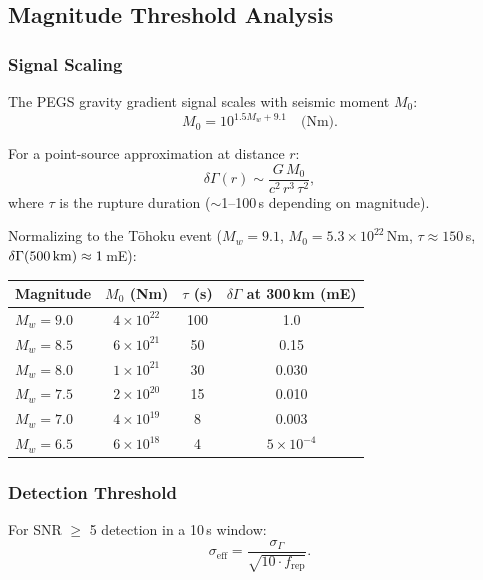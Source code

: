 \documentclass[11pt]{article}
\theoremstyle{definition}
\theoremstyle{remark}
\newcommand{\ee}[1]{\times10^{#1}}
\begin{document}
\subsection{Magnitude Threshold Analysis}

\subsubsection{Signal Scaling}

The PEGS gravity gradient signal scales with seismic moment $M_0$:
\begin{equation}
  M_0 = 10^{1.5 M_w + 9.1} \quad \text{(Nm)}.
\end{equation}

For a point-source approximation at distance $r$:
\begin{equation}
  \delta\Gamma(r) \sim \frac{G \, M_0}{c^2 \, r^3 \, \tau^2},
\end{equation}
where $\tau$ is the rupture duration ($\sim$1--100\,s depending on magnitude).

Normalizing to the T\=ohoku event ($M_w = 9.1$, $M_0 = 5.3\ee{22}$\,Nm,
$\tau \approx 150$\,s, $\delta\Gamma(\text{500\,km}) \approx 1$\,mE):

\begin{center}
\begin{tabular}{lccc}
\toprule
\textbf{Magnitude} & \textbf{$M_0$ (Nm)} & \textbf{$\tau$ (s)} & \textbf{$\delta\Gamma$ at 300\,km (mE)} \\
\midrule
$M_w = 9.0$ & $4\ee{22}$ & 100 & 1.0 \\
$M_w = 8.5$ & $6\ee{21}$ & 50 & 0.15 \\
$M_w = 8.0$ & $1\ee{21}$ & 30 & 0.030 \\
$M_w = 7.5$ & $2\ee{20}$ & 15 & 0.010 \\
$M_w = 7.0$ & $4\ee{19}$ & 8 & 0.003 \\
$M_w = 6.5$ & $6\ee{18}$ & 4 & $5\ee{-4}$ \\
\bottomrule
\end{tabular}
\end{center}

\subsubsection{Detection Threshold}

For SNR $\geq$ 5 detection in a 10\,s window:
\begin{equation}
  \sigma_{\text{eff}} = \frac{\sigma_\Gamma}{\sqrt{10 \cdot f_{\text{rep}}}} .
\end{equation}
\end{document}
